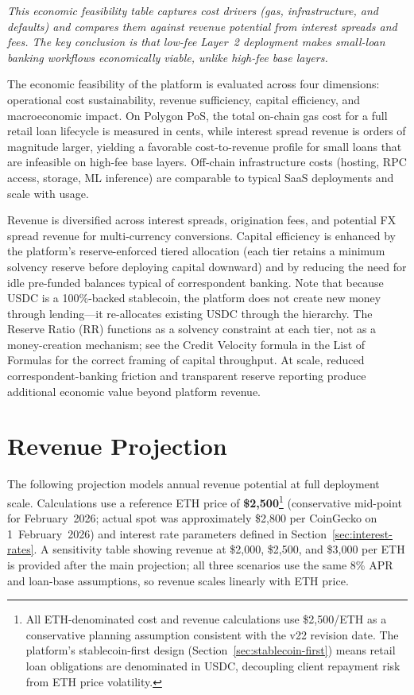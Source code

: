 \documentclass[12pt,a4paper]{report}
\begin{document}
\vspace{2pt}
\noindent\textit{\small This economic feasibility table captures cost drivers (gas, infrastructure, and defaults) and compares them against revenue potential from interest spreads and fees. The key conclusion is that low-fee Layer~2 deployment makes small-loan banking workflows economically viable, unlike high-fee base layers.}

The economic feasibility of the platform is evaluated across four dimensions: operational cost sustainability, revenue sufficiency, capital efficiency, and macroeconomic impact. On Polygon PoS, the total on-chain gas cost for a full retail loan lifecycle is measured in cents, while interest spread revenue is orders of magnitude larger, yielding a favorable cost-to-revenue profile for small loans that are infeasible on high-fee base layers. Off-chain infrastructure costs (hosting, RPC access, storage, ML inference) are comparable to typical SaaS deployments and scale with usage.

Revenue is diversified across interest spreads, origination fees, and potential FX spread revenue for multi-currency conversions. Capital efficiency is enhanced by the platform's reserve-enforced tiered allocation (each tier retains a minimum solvency reserve before deploying capital downward) and by reducing the need for idle pre-funded balances typical of correspondent banking. Note that because USDC is a 100\%-backed stablecoin, the platform does not create new money through lending---it re-allocates existing USDC through the hierarchy. The Reserve Ratio (RR) functions as a solvency constraint at each tier, not as a money-creation mechanism; see the Credit Velocity formula in the List of Formulas for the correct framing of capital throughput. At scale, reduced correspondent-banking friction and transparent reserve reporting produce additional economic value beyond platform revenue.

\section{Revenue Projection}

The following projection models annual revenue potential at full deployment scale. Calculations use a reference ETH price of \textbf{\$2,500}\footnote{All ETH-denominated cost and revenue calculations use \$2{,}500/ETH as a conservative planning assumption consistent with the v22 revision date. The platform's stablecoin-first design (Section~\ref{sec:stablecoin-first}) means retail loan obligations are denominated in USDC, decoupling client repayment risk from ETH price volatility.} (conservative mid-point for February~2026; actual spot was approximately \$2,800 per CoinGecko on 1~February~2026) and interest rate parameters defined in Section~\ref{sec:interest-rates}. A sensitivity table showing revenue at \$2,000, \$2,500, and \$3,000 per ETH is provided after the main projection; all three scenarios use the same 8\% APR and loan-base assumptions, so revenue scales linearly with ETH price.
\end{document}
